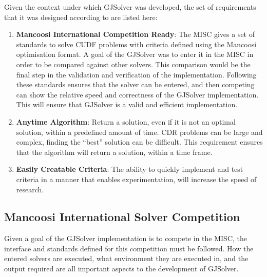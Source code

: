 Given the context under which GJSolver was developed, the set of requirements that it was designed according to are listed here:
\begin{enumerate}
  \item \textbf{Mancoosi International Competition Ready}: The MISC gives a set of standards to solve CUDF problems with criteria defined using the Mancoosi optimisation format.
  A goal of the GJSolver was to enter it in the MISC in order to be compared against other solvers.
  This comparison would be the final step in the validation and verification of the implementation.
  Following these standards ensures that the solver can be entered, and then competing can show the relative speed and correctness of the GJSolver implementation.
  This will ensure that GJSolver is a valid and efficient implementation. 
  \item \textbf{Anytime Algorithm}: Return a solution, even if it is not an optimal solution, within a predefined amount of time. 
  CDR problems can be large and complex, finding the ``best'' solution can be difficult. 
  This requirement ensures that the algorithm will return a solution, within a time frame.
  \item \textbf{Easily Creatable Criteria}: The ability to quickly implement and test criteria in a manner that enables experimentation, will increase the speed of research.
\end{enumerate}

\subsection{Mancoosi International Solver Competition}
Given a goal of the GJSolver implementation is to compete in the MISC, the interface and standards defined for this competition must be followed.
How the entered solvers are executed, what environment they are executed in, and the output required are all important aspects to the development of GJSolver.

